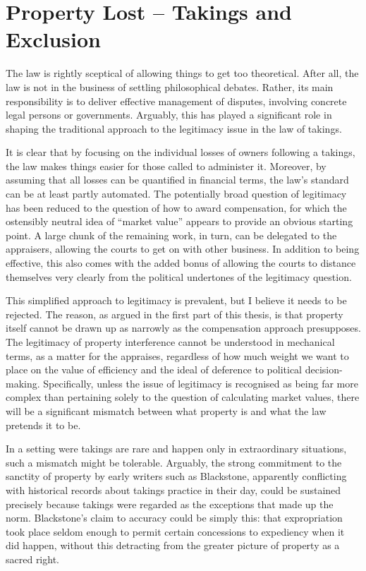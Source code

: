 \section{Property Lost -- Takings and Exclusion}\label{sec:7:1}

The law is rightly sceptical of allowing things to get too theoretical. After all, the law is not in the business of settling philosophical debates. Rather, its main responsibility is to deliver effective management of disputes, involving concrete legal persons or governments. Arguably, this has played a significant role in shaping the traditional approach to the legitimacy issue in the law of takings.

It is clear that by focusing on the individual losses of owners following a takings, the law makes things easier for those called to administer it. Moreover, by assuming that all losses can be quantified in financial terms, the law's standard can be at least partly automated. The potentially broad question of legitimacy has been reduced to the question of how to award compensation, for which the ostensibly neutral idea of ``market value'' appears to provide an obvious starting point. A large chunk of the remaining work, in turn, can be delegated to the appraisers, allowing the courts to get on with other business. In addition to being effective, this also comes with the added bonus of allowing the courts to distance themselves very clearly from the political undertones of the legitimacy question.

This simplified approach to legitimacy is prevalent, but I believe it needs to be rejected. The reason, as argued in the first part of this thesis, is that property itself cannot be drawn up as narrowly as the compensation approach presupposes. The legitimacy of property interference cannot be understood in mechanical terms, as a matter for the appraises, regardless of how much weight we want to place on the value of efficiency and the ideal of deference to political decision-making. Specifically, unless the issue of legitimacy is recognised as being far more complex than pertaining solely to the question of calculating market values, there will be a significant mismatch between what property is and what the law pretends it to be.

In a setting were takings are rare and happen only in extraordinary situations, such a mismatch might be tolerable. Arguably, the strong commitment to the sanctity of property by early writers such as Blackstone, apparently conflicting with historical records about takings practice in their day, could be sustained precisely because takings were regarded as the exceptions that made up the norm.  Blackstone's claim to accuracy could be simply this: that expropriation took place seldom enough to permit certain concessions to expediency when it did happen, without this detracting from the greater picture of property as a sacred right.

